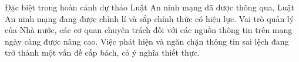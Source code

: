 Đặc biệt trong hoàn cảnh dự thảo Luật An ninh mạng đã được thông qua, Luật An ninh mạng đang được chỉnh lí và sắp chính thức có hiệu lực. Vai trò quản lý của Nhà nước, các cơ quan chuyên trách đối với các nguồn thông tin trên mạng ngày càng được nâng cao. Việc phát hiện và ngăn chặn thông tin sai lệch đang trở thành một vấn đề cấp bách, có ý nghĩa thiết thực.


	